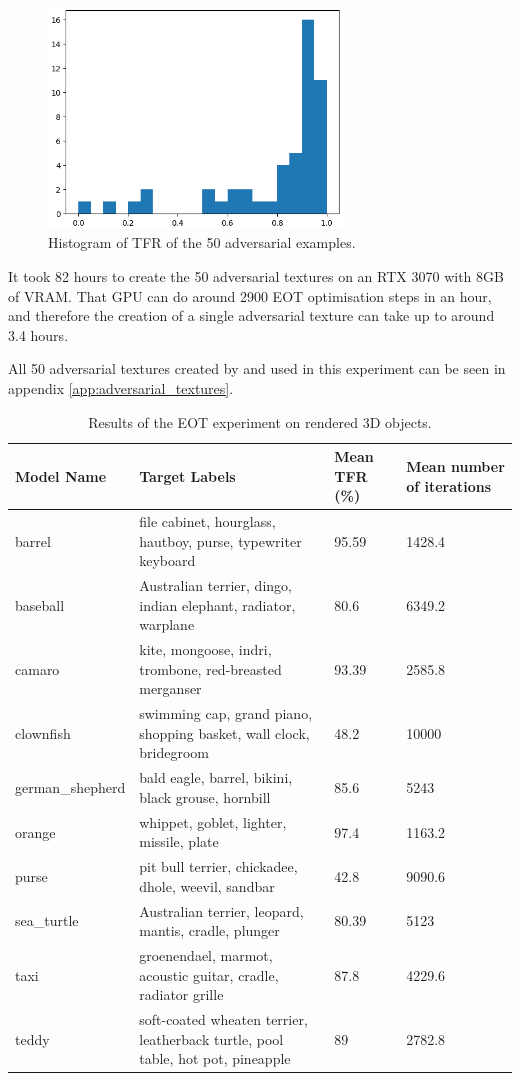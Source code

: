 \begin{figure}[ht]
    \centering
    \includegraphics[width=0.7\textwidth]{graphics/eot_histogram.PNG}
    \caption{Histogram of TFR of the 50 adversarial examples.}
    \label{fig:eot_histogram}
\end{figure}

It took 82 hours to create the 50 adversarial textures on an RTX 3070 with 8GB of VRAM. That GPU can do around 2900 EOT optimisation steps in an hour, and therefore the creation of a single adversarial texture can take up to around 3.4 hours.

All 50 adversarial textures created by and used in this experiment can be seen in appendix \ref{app:adversarial_textures}.

\begin{table}
\caption{Results of the EOT experiment on rendered 3D objects.}
\label{table:eot_results}
\begin{tabular}{|p{2.6cm} | p{6.5cm} | p{2cm}| p{2cm}|} 
 \hline
 Model Name & Target Labels & Mean TFR (\%) & Mean number of iterations \\
 \hline
 barrel & file cabinet, hourglass, hautboy, purse, typewriter keyboard & 95.59 & 1428.4 \\ 
 \hline
 baseball & Australian terrier, dingo, indian elephant, radiator, warplane & 80.6 & 6349.2 \\
 \hline
 camaro & kite, mongoose, indri, trombone, red-breasted merganser & 93.39 & 2585.8 \\
 \hline
 clownfish & swimming cap, grand piano, shopping basket, wall clock, bridegroom & 48.2 & 10000 \\
 \hline
 german\_shepherd & bald eagle, barrel, bikini, black grouse, hornbill & 85.6 & 5243 \\
 \hline
 orange & whippet, goblet, lighter, missile, plate & 97.4 & 1163.2 \\
 \hline
 purse & pit bull terrier, chickadee, dhole, weevil, sandbar & 42.8 & 9090.6 \\
 \hline
 sea\_turtle & Australian terrier, leopard, mantis, cradle, plunger & 80.39 & 5123 \\
 \hline
 taxi & groenendael, marmot, acoustic guitar, cradle, radiator grille & 87.8 & 4229.6 \\
 \hline
 teddy & soft-coated wheaten terrier, leatherback turtle, pool table, hot pot, pineapple & 89 & 2782.8 \\
 \hline
\end{tabular}
\end{table}

